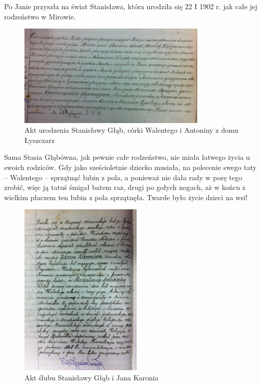 Po Janie przyszła na świat Stanisława, która urodziła się 22 I 1902 r. jak całe jej rodzeństwo w Mirowie. 

\begin{figure}
\begin{center}
\includegraphics[width=0.8\textwidth]{zdjecia/akt_urodzenia_stanislawy_glab.jpg}
\caption[Akt urodzenia Stanisławy Głąb]{Akt urodzenia Stanisławy Głąb, córki Walentego i Antoniny z domu Łyszczarz}
\label{rys:akt_urodzenia_stanislawy_glab}
\end{center}
\end{figure}

Sama Stasia Głąbówna, jak pewnie całe rodzeństwo, nie miała łatwego życia u swoich rodziców. Gdy jako sześcioletnie dziecko musiała, na polecenie swego taty -- Walentego -- sprzątnąć łubin z pola, a ponieważ nie dała rady w porę tego zrobić, więc ją tatuś śmigał batem raz, drugi po gołych nogach, aż w końcu z wielkim płaczem ten łubin z pola sprzątnęła. Twarde było życie dzieci na wsi!

\begin{figure}
\begin{center}
\includegraphics[width=0.52\textwidth]{zdjecia/akt_slubu_stanislawy_i_jana_karoniow.jpg}
\caption{Akt ślubu Stanisławy Głąb i Jana Karonia}
\label{rys:akt_slubu_stanislawy_i_jana_karoniow}
\end{center}
\end{figure}

